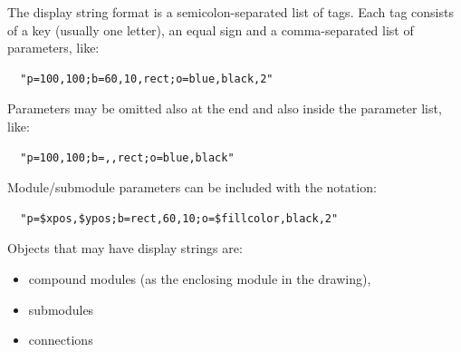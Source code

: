 The display string format is a semicolon-separated list of tags.
Each tag consists of a key (usually one letter), an equal sign
and a comma-separated list of parameters, like:

\begin{verbatim}
  "p=100,100;b=60,10,rect;o=blue,black,2"
\end{verbatim}

Parameters may be omitted also at the end and also inside the
parameter list, like:

\begin{verbatim}
  "p=100,100;b=,,rect;o=blue,black"
\end{verbatim}

Module/submodule parameters can be included with the  notation:

\begin{verbatim}
  "p=$xpos,$ypos;b=rect,60,10;o=$fillcolor,black,2"
\end{verbatim}

Objects that may have display strings are:
\begin{itemize}
  \item{compound modules (as the enclosing module in the drawing),}
  \item{submodules}
  \item{connections}
\end{itemize}



